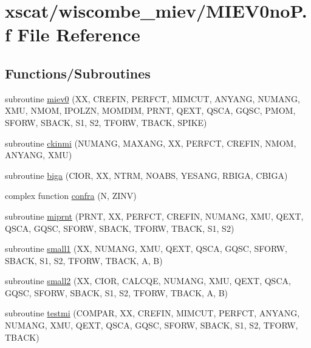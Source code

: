 \hypertarget{_m_i_e_v0no_p_8f}{}\section{xscat/wiscombe\+\_\+miev/\+M\+I\+E\+V0noP.f File Reference}
\label{_m_i_e_v0no_p_8f}
\subsection*{Functions/\+Subroutines}
\begin{DoxyCompactItemize}
\item 
subroutine \hyperlink{_m_i_e_v0no_p_8f_a48092e733ab76cc9db0501ed3b28d9ff}{miev0} (XX, C\+R\+E\+F\+IN, P\+E\+R\+F\+CT, M\+I\+M\+C\+UT, A\+N\+Y\+A\+NG, N\+U\+M\+A\+NG, X\+MU, N\+M\+OM, I\+P\+O\+L\+ZN, M\+O\+M\+D\+IM, P\+R\+NT, Q\+E\+XT, Q\+S\+CA, G\+Q\+SC, P\+M\+OM, S\+F\+O\+RW, S\+B\+A\+CK, S1, S2, T\+F\+O\+RW, T\+B\+A\+CK, S\+P\+I\+KE)
\item 
subroutine \hyperlink{_m_i_e_v0no_p_8f_a06fe91ee97b1295c97915feaad0d2e13}{ckinmi} (N\+U\+M\+A\+NG, M\+A\+X\+A\+NG, XX, P\+E\+R\+F\+CT, C\+R\+E\+F\+IN, N\+M\+OM, A\+N\+Y\+A\+NG, X\+MU)
\item 
subroutine \hyperlink{_m_i_e_v0no_p_8f_affcbe26d3e8beb59e07c207f2b0da43a}{biga} (C\+I\+OR, XX, N\+T\+RM, N\+O\+A\+BS, Y\+E\+S\+A\+NG, R\+B\+I\+GA, C\+B\+I\+GA)
\item 
complex function \hyperlink{_m_i_e_v0no_p_8f_ad91aace4d77229d367c28c78965a0bd5}{confra} (N, Z\+I\+NV)
\item 
subroutine \hyperlink{_m_i_e_v0no_p_8f_ae5c893640b8e33659ca8a9eb3c3c26ce}{miprnt} (P\+R\+NT, XX, P\+E\+R\+F\+CT, C\+R\+E\+F\+IN, N\+U\+M\+A\+NG, X\+MU, Q\+E\+XT, Q\+S\+CA, G\+Q\+SC, S\+F\+O\+RW, S\+B\+A\+CK, T\+F\+O\+RW, T\+B\+A\+CK, S1, S2)
\item 
subroutine \hyperlink{_m_i_e_v0no_p_8f_a42db51d8245d25e068704071519e108f}{small1} (XX, N\+U\+M\+A\+NG, X\+MU, Q\+E\+XT, Q\+S\+CA, G\+Q\+SC, S\+F\+O\+RW, S\+B\+A\+CK, S1, S2, T\+F\+O\+RW, T\+B\+A\+CK, A, B)
\item 
subroutine \hyperlink{_m_i_e_v0no_p_8f_a4bae82b3142e7b49e6b14b735ea23988}{small2} (XX, C\+I\+OR, C\+A\+L\+C\+QE, N\+U\+M\+A\+NG, X\+MU, Q\+E\+XT, Q\+S\+CA, G\+Q\+SC, S\+F\+O\+RW, S\+B\+A\+CK, S1, S2, T\+F\+O\+RW, T\+B\+A\+CK, A, B)
\item 
subroutine \hyperlink{_m_i_e_v0no_p_8f_aa46efb14b8780b792d5cdaecc7693068}{testmi} (C\+O\+M\+P\+AR, XX, C\+R\+E\+F\+IN, M\+I\+M\+C\+UT, P\+E\+R\+F\+CT, A\+N\+Y\+A\+NG, N\+U\+M\+A\+NG, X\+MU, Q\+E\+XT, Q\+S\+CA, G\+Q\+SC, S\+F\+O\+RW, S\+B\+A\+CK, S1, S2, T\+F\+O\+RW, T\+B\+A\+CK)
\end{DoxyCompactItemize}


